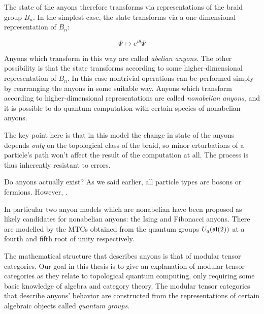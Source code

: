 The state of the anyons therefore transforms via representations of the braid
group $B_n$. In the simplest case, the state transforms via a one-dimensional
representation of $B_n$:

\begin{equation}
\Psi \mapsto e^{i\theta}\Psi
\end{equation}

Anyons which transform in this way are called \emph{abelian anyons}. The other
possibility is that the state transforms according to some higher-dimensional
representation of $B_n$. In this case nontrivial operations can be performed
simply by rearranging the anyons in some suitable way. Anyons which transform
according to higher-dimensional representations are called \emph{nonabelian
anyons}, and it is possible to do quantum computation with certain species
of nonabelian anyons.

The key point here is that in this model the change in state of the anyons
depends \emph{only} on the topological class of the braid, so minor
erturbations of a particle's path won't affect the result of the computation at
all. The process is thus inherently resistant to errors. 

Do anyons actually exist? As we said earlier, all particle types are bosons or
fermions. However, .



In particular two anyon models which are nonabelian have been proposed as
likely candidates for nonabelian anyons: the Ising and Fibonacci anyons. There
are modelled by the MTCs obtained from the quantum groups $U_q(\mathfrak{sl}(2))$ at a
fourth and fifth root of unity respectively. 

The mathematical structure that describes anyons is that of modular tensor
categories. Our goal in this thesis is to give an explanation of modular tensor
categories as they relate to topological quantum computing, only requiring some
basic knowledge of algebra and category theory. The modular tensor categories
that describe anyons' behavior are constructed from the representations of
certain algebraic objects called \emph{quantum groups}.




